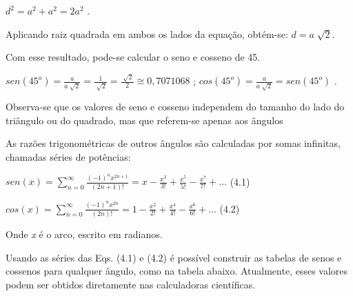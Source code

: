 \begin{texemplo}
 \( d^{2}=a^{2}+a^{2}=2a^{2} \) .

Aplicando raiz quadrada em ambos os lados da equação, obtém-se:  \( d=a\sqrt[]{2}. \)

Com esse resultado, pode-se calcular o seno e cosseno de 45\degree.

 \( sen \left( 45^{o} \right) =\frac{a}{a\sqrt[]{2}}=\frac{1}{\sqrt[]{2}}=\frac{\sqrt[]{2}}{2} \cong 0,7071068 \)     ;   \( cos \left( 45^{o} \right) =\frac{a}{a\sqrt[]{2}}=sen \left( 45^{o} \right)  \) .

Observa-se que os valores de seno e cosseno independem do tamanho do lado do triângulo ou do quadrado, mas que referem-se apenas aos ângulos \qedsymbol
\end{texemplo}

As razões trigonométricas de outros ângulos são calculadas por somas infinitas, chamadas séries de potências:

 \( sen \left( x \right) = \sum _{n=0}^{\infty}\frac{ \left( -1 \right) ^{n} x^{2n+1}}{ \left( 2n+1 \right) !}=x-\frac{x^{3}}{3!}+\frac{x^{5}}{5!}-\frac{x^{7}}{7!}+ \ldots  \) \tab \tab \tab (4.1)

 \( cos \left( x \right) = \sum _{n=0}^{\infty}\frac{ \left( -1 \right) ^{n} x^{2n}}{ \left( 2n \right) !}=1-\frac{x^{2}}{2!}+\frac{x^{4}}{4!}-\frac{x^{6}}{6!}+ \ldots  \) \tab \tab \tab (4.2)

Onde \textit{x} é o arco, escrito em radianos.

Usando as séries das Eqs. (4.1) e (4.2) é possível construir as tabelas de senos e cossenos para qualquer ângulo, como na tabela abaixo. Atualmente, esses valores podem ser obtidos diretamente nas calculadoras científicas.

